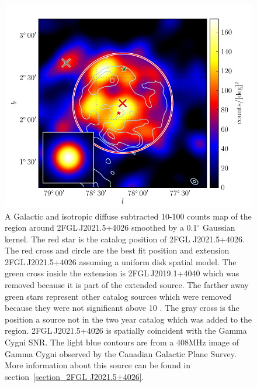 \documentclass[12pt,preprint]{aastex}
\newcommand{\gev}{\text{GeV}\xspace}
\renewcommand{\deg}{\ensuremath{^\circ}\xspace}
\begin{document}
\begin{figure}
  \begin{center}
    \includegraphics[type=pdf,ext=.pdf,read=.pdf]{source_plots/source_Gamma_Cygni}
  \end{center}
  \caption{A Galactic and isotropic diffuse subtracted 10-100
  \gev counts map of the region around 2FGL\,J2021.5+4026 smoothed by a
  0.1\deg Gaussian kernel. The red star is the catalog position of 2FGL
  J2021.5+4026.  The red cross and circle are the best fit position and
  extension 2FGL\,J2021.5+4026 assuming a uniform disk spatial model.
  The green cross inside the extension is 2FGL\,J2019.1+4040 which
  was removed because it is part of the extended source.  The farther
  away green stars represent other catalog sources which were removed
  because they were not significant above 10 \gev.  The gray cross is
  the position a source not in the two year catalog which was added
  to the region. 2FGL\,J2021.5+4026 is spatially coincident with the
  Gamma Cygni SNR.  The light blue contours are from a 408MHz image of Gamma Cygni
  observed by the Canadian Galactic Plane Survey.  More information about
  this source can be found in section~\ref{section_2FGL J2021.5+4026}.
  }\label{1FGL_J2020.0+4049}
\end{figure}
\end{document}
